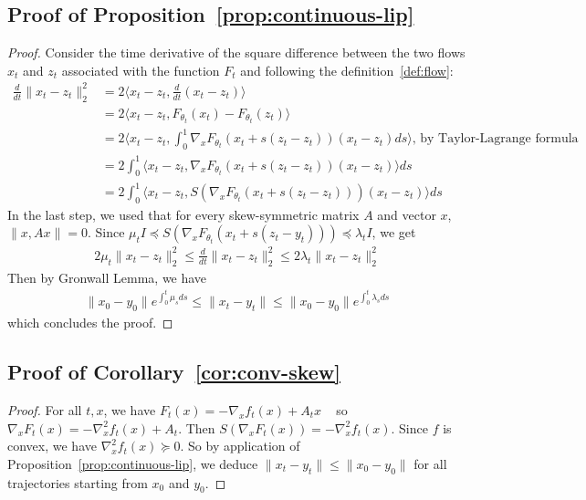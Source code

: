 \subsection{Proof of Proposition~\ref{prop:continuous-lip}}
\label{proof:continuous-lip}

\begin{proof}
Consider the time derivative of the square difference between the two flows $x_t$ and $z_t$ associated with the function $F_t$ and following the definition~\ref{def:flow}: 
\begin{align*}
  \frac{d}{dt} \lVert x_t-z_t\rVert_2^2 & = 2 \big\langle x_t-z_t,\frac{d}{dt}( x_t-z_t)\big\rangle\\
    &=2 \big\langle x_t-z_t,F_{\theta_{t}}(x_{t})-F_{\theta_{t}}(z_{t})\big\rangle \\
    &=  2 \big\langle x_t-z_t,\int_0^1\nabla_xF_{\theta_{t}}(x_{t}+s(z_t-z_t))(x_t-z_t)ds\big\rangle\textrm{, by Taylor-Lagrange formula}\\ 
    &=  2 \int_0^1\big\langle x_t-z_t,\nabla_xF_{\theta_{t}}(x_{t}+s(z_t-z_t))(x_t-z_t)\big\rangle ds\\
     &=  2 \int_0^1\big\langle x_t-z_t,S(\nabla_xF_{\theta_{t}}(x_{t}+s(z_t-z_t)))(x_t-z_t)\big\rangle ds
\end{align*}
In the last step, we used that for every skew-symmetric matrix $A$ and vector $x$, $\lVert x,Ax\rVert = 0$.
Since $\mu_tI\preceq S(\nabla_xF_{\theta_{t}}(x_{t}+s(z_t-y_t)))\preceq  \lambda_tI$, we get
\begin{align*}
 2\mu_t \lVert x_t-z_t\rVert_2^2 \leq \frac{d}{dt} \lVert x_t-z_t\rVert_2^2 \leq 2\lambda_t \lVert x_t-z_t\rVert_2^2
\end{align*}
Then by Gronwall Lemma, we have
\begin{align*}
  \lVert x_0-y_0 \rVert e^{\int_0^t\mu_s ds}\leq \lVert x_t-y_t \rVert\leq \lVert x_0-y_0 \rVert e^{ \int_0^t\lambda_s ds}
\end{align*}
which concludes the proof.
\end{proof}

\subsection{Proof of Corollary~\ref{cor:conv-skew}}
\label{proof:conv-skew}
\begin{proof}

For all $t,x$, we have $F_t(x) = -\nabla_x f_{t}(x)+A_t x$ ~ so~
$\nabla_x F_t(x) = -\nabla_x^2 f_{t}(x)+A_t$. Then $S(\nabla_x F_t(x)) =-\nabla_x^2 f_{t}(x)$. Since $f$ is convex, we have $\nabla_x^2 f_{t}(x)\succeq 0$. So by application of Proposition~\ref{prop:continuous-lip}, we deduce $\lVert x_t-y_t \rVert\leq \lVert x_0-y_0 \rVert$ for all trajectories starting from $x_0$ and $y_0$.
\end{proof}

